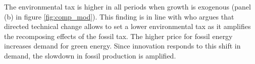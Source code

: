 %
%
%




The environmental tax is higher in all periods when growth is exogenous (panel (b) in figure \ref{fig:comp_mod}). This finding is in line with \cite{Fried2018ClimateAnalysis} who argues that directed technical change allows to set a lower environmental tax as it amplifies the recomposing effects of the fossil tax. The higher price for fossil energy increases demand for green energy. Since innovation responds to this shift in demand, the slowdown in fossil production is amplified. 



